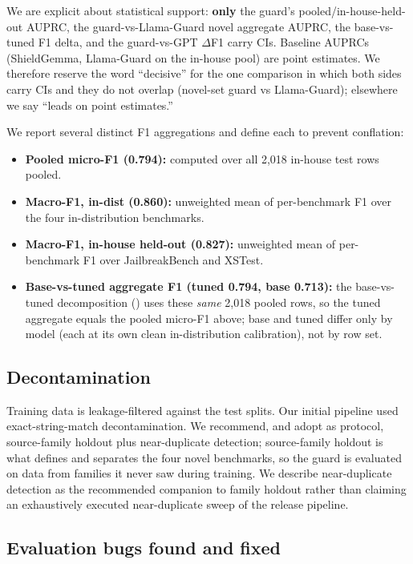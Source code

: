 \documentclass[sigconf,nonacm]{acmart}
\begin{document}
We are explicit about statistical support: \textbf{only} the guard's pooled/in-house-held-out AUPRC, the guard-vs-Llama-Guard novel aggregate AUPRC, the base-vs-tuned F1 delta, and the guard-vs-GPT $\Delta$F1 carry CIs. Baseline AUPRCs (ShieldGemma, Llama-Guard on the in-house pool) are point estimates. We therefore reserve the word ``decisive'' for the one comparison in which both sides carry CIs and they do not overlap (novel-set guard vs Llama-Guard); elsewhere we say ``leads on point estimates.''

We report several distinct F1 aggregations and define each to prevent conflation:

\begin{itemize}
  \item \textbf{Pooled micro-F1 (0.794):} computed over all 2,018 in-house test rows pooled.
  \item \textbf{Macro-F1, in-dist (0.860):} unweighted mean of per-benchmark F1 over the four in-distribution benchmarks.
  \item \textbf{Macro-F1, in-house held-out (0.827):} unweighted mean of per-benchmark F1 over JailbreakBench and XSTest.
  \item \textbf{Base-vs-tuned aggregate F1 (tuned 0.794, base 0.713):} the base-vs-tuned decomposition () uses these \emph{same} 2,018 pooled rows, so the tuned aggregate equals the pooled micro-F1 above; base and tuned differ only by model (each at its own clean in-distribution calibration), not by row set.
\end{itemize}

\subsection{Decontamination}

Training data is leakage-filtered against the test splits. Our initial pipeline used exact-string-match decontamination. We recommend, and adopt as protocol, source-family holdout plus near-duplicate detection; source-family holdout is what defines and separates the four novel benchmarks, so the guard is evaluated on data from families it never saw during training. We describe near-duplicate detection as the recommended companion to family holdout rather than claiming an exhaustively executed near-duplicate sweep of the release pipeline.

\subsection{Evaluation bugs found and fixed}
\label{sec:bugs}
\end{document}

